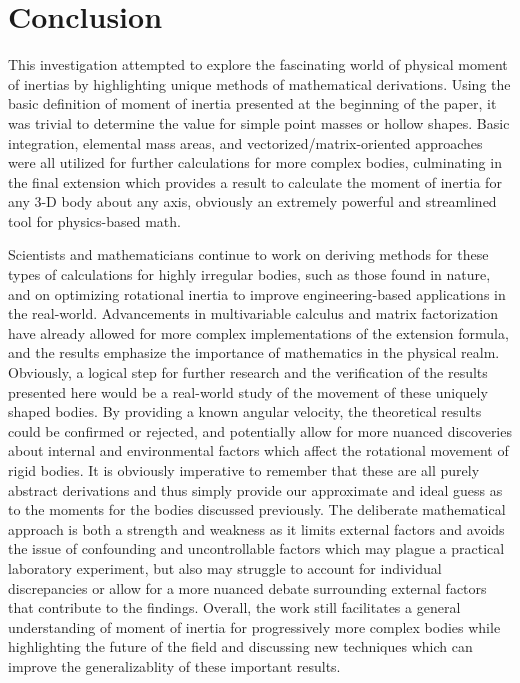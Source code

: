 \section{Conclusion}

This investigation attempted to explore the fascinating world of physical moment of inertias by highlighting unique methods of mathematical derivations. Using the basic definition of moment of inertia presented at the beginning of the paper, it was trivial to determine the value for simple point masses or hollow shapes. Basic integration, elemental mass areas, and vectorized/matrix-oriented approaches were all utilized for further calculations for more complex bodies, culminating in the final extension which provides a result to calculate the moment of inertia for any 3-D body about any axis, obviously an extremely powerful and streamlined tool for physics-based math. 

Scientists and mathematicians continue to work on deriving methods for these types of calculations for highly irregular bodies, such as those found in nature, and on optimizing rotational inertia to improve engineering-based applications in the real-world. Advancements in multivariable calculus and matrix factorization have already allowed for more complex implementations of the extension formula, and the results emphasize the importance of mathematics in the physical realm. Obviously, a logical step for further research and the verification of the results presented here would be a real-world study of the movement of these uniquely shaped bodies. By providing a known angular velocity, the theoretical results could be confirmed or rejected, and potentially allow for more nuanced discoveries about internal and environmental factors which affect the rotational movement of rigid bodies. It is obviously imperative to remember that these are all purely abstract derivations and thus simply provide our approximate and ideal guess as to the moments for the bodies discussed previously. The deliberate mathematical approach is both a strength and weakness as it limits external factors and avoids the issue of confounding and uncontrollable factors which may plague a practical laboratory experiment, but also may struggle to account for individual discrepancies or allow for a more nuanced debate surrounding external factors that contribute to the findings. Overall, the work still facilitates a general understanding of moment of inertia for progressively more complex bodies while highlighting the future of the field and discussing new techniques which can improve the generalizablity of these important results.